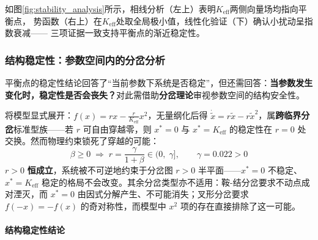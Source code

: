 \documentclass[12pt,a4paper]{ctexart}
\begin{document}
\begin{table}[htbp]
如图\ref{fig:stability_analysis}所示，相线分析（左上）表明$K_{\text{eff}}$两侧向量场均指向平衡点，
势函数（右上）在$K_{\text{eff}}$处取全局极小值，线性化验证（下）确认小扰动呈指数衰减——
三项证据一致支持平衡点的渐近稳定性。

\subsubsection{结构稳定性：参数空间内的分岔分析}

平衡点的稳定性结论回答了``当前参数下系统是否稳定''，但还需回答：\textbf{当参数发生变化时，稳定性是否会丧失？}对此需借助\textbf{分岔理论}\cite{strogatz}审视参数空间的结构安全性。

将模型显式展开：$f(x) = r x - \frac{r}{K_{\text{eff}}} x^2$，无量纲化后得 $\dot{\tilde{x}} = r\tilde{x} - r\tilde{x}^2$，属\textbf{跨临界分岔}标准型族——若 $r$ 可自由穿越零，则 $x^*=0$ 与 $x^*=K_{\text{eff}}$ 的稳定性在 $r=0$ 处交换。然而物理约束锁死了穿越的可能：
\begin{equation}
\beta \geq 0 \;\Rightarrow\; r = \frac{\gamma}{1+\beta} \in (0,\; \gamma],\qquad \gamma = 0.022 > 0
\end{equation}
$r > 0$ \textbf{恒成立}，系统被不可逆地约束于分岔图 $r > 0$ 半平面——$x^* = 0$ 不稳定、$x^* = K_{\text{eff}}$ 稳定的格局不会改变。其余分岔类型亦不适用：鞍-结分岔要求不动点成对湮灭，而 $x^*=0$ 由因式分解产生、不可能消失；叉形分岔要求 $f(-x)=-f(x)$ 的奇对称性，而模型中 $x^2$ 项的存在直接排除了这一可能。

\paragraph{结构稳定性结论}

\begin{center}
\end{center}


\end{table}
\end{document}
